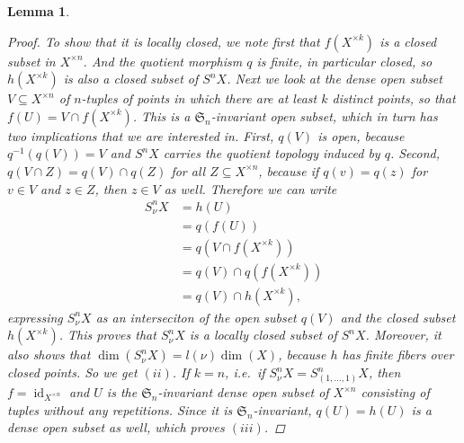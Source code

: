 \documentclass[12pt,a4paper]{amsart}
\theoremstyle{plain}
\newtheorem{lm}[thm]{Lemma}
\theoremstyle{definition}
\theoremstyle{remark}
\begin{document}
\begin{lm}
\begin{proof}
    To show that it is locally closed, we note first that $f(X^{\times k})$ is a closed subset in $X^{\times n}$.
    And the quotient morphism $q$ is finite, in particular closed, so $h(X^{\times k})$ is also a closed subset of $S^{n}X$.
    Next we look at the dense open subset $V \subseteq X^{\times n}$ of $n$-tuples of points in which there are at least $k$ distinct points, so that $f(U) = V \cap f(X^{\times k})$.
    This is a $\mathfrak{S}_{n}$-invariant open subset, which in turn has two implications that we are interested in.
    First, $q(V)$ is open, because $q^{-1}(q(V)) = V$ and $S^{n}X$ carries the quotient topology induced by $q$.
    Second, $q(V \cap Z) = q(V) \cap q(Z)$ for all $Z \subseteq X^{\times n}$, because if $q(v) = q(z)$ for $v \in V$ and $z \in Z$, then $z \in V$ as well.
    Therefore we can write
    \begin{align*}
      S_{\nu}^{n}X & = h(U) \\
      & = q(f(U)) \\
      & = q(V \cap f(X^{\times k})) \\
      & = q(V) \cap q(f(X^{\times k})) \\
      & = q(V) \cap h(X^{\times k}),
    \end{align*}
    expressing $S_{\nu}^{n}X$ as an interseciton of the open subset $q(V)$ and the closed subset $h(X^{\times k})$.
    This proves that $S_{\nu}^{n}X$ is a locally closed subset of $S^{n}X$.
    Moreover, it also shows that $\dim(S_{\nu}^{n}X) = l(\nu)\dim(X)$, because $h$ has finite fibers over closed points.
    So we get $(ii)$.
    If $k = n$, i.e.~if $S^{n}_{\nu}X = S^{n}_{(1,\ldots, 1)}X$, then $f = \operatorname{id}_{X^{\times n}}$ and $U$ is the $\mathfrak{S}_{n}$-invariant dense open subset of $X^{\times n}$ consisting of tuples without any repetitions.
    Since it is $\mathfrak{S}_{n}$-invariant, $q(U) = h(U)$ is a dense open subset as well, which proves $(iii)$.
    

\end{proof}
\end{lm}
\end{document}

